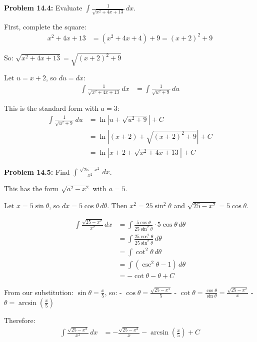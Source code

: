 \documentclass[12pt,a4paper]{book}
\theoremstyle{definition}
\begin{document}
\begin{solution}
\textbf{Problem 14.4:} Evaluate $\int \frac{1}{\sqrt{x^2 + 4x + 13}} \, dx$.

First, complete the square:
\begin{align}
x^2 + 4x + 13 &= (x^2 + 4x + 4) + 9 = (x + 2)^2 + 9
\end{align}

So: $\sqrt{x^2 + 4x + 13} = \sqrt{(x + 2)^2 + 9}$

Let $u = x + 2$, so $du = dx$:
\begin{align}
\int \frac{1}{\sqrt{x^2 + 4x + 13}} \, dx &= \int \frac{1}{\sqrt{u^2 + 9}} \, du
\end{align}

This is the standard form with $a = 3$:
\begin{align}
\int \frac{1}{\sqrt{u^2 + 9}} \, du &= \ln|u + \sqrt{u^2 + 9}| + C\\
&= \ln|(x + 2) + \sqrt{(x + 2)^2 + 9}| + C\\
&= \ln|x + 2 + \sqrt{x^2 + 4x + 13}| + C
\end{align}
\end{solution}

\begin{solution}
\textbf{Problem 14.5:} Find $\int \frac{\sqrt{25 - x^2}}{x^2} \, dx$.

This has the form $\sqrt{a^2 - x^2}$ with $a = 5$.

Let $x = 5\sin\theta$, so $dx = 5\cos\theta \, d\theta$.
Then $x^2 = 25\sin^2\theta$ and $\sqrt{25 - x^2} = 5\cos\theta$.

\begin{align}
\int \frac{\sqrt{25 - x^2}}{x^2} \, dx &= \int \frac{5\cos\theta}{25\sin^2\theta} \cdot 5\cos\theta \, d\theta\\
&= \int \frac{25\cos^2\theta}{25\sin^2\theta} \, d\theta\\
&= \int \cot^2\theta \, d\theta\\
&= \int (\csc^2\theta - 1) \, d\theta\\
&= -\cot\theta - \theta + C
\end{align}

From our substitution: $\sin\theta = \frac{x}{5}$, so:
- $\cos\theta = \frac{\sqrt{25-x^2}}{5}$
- $\cot\theta = \frac{\cos\theta}{\sin\theta} = \frac{\sqrt{25-x^2}}{x}$
- $\theta = \arcsin\left(\frac{x}{5}\right)$

Therefore:
\begin{align}
\int \frac{\sqrt{25 - x^2}}{x^2} \, dx &= -\frac{\sqrt{25-x^2}}{x} - \arcsin\left(\frac{x}{5}\right) + C
\end{align}
\end{solution}
\end{document}

